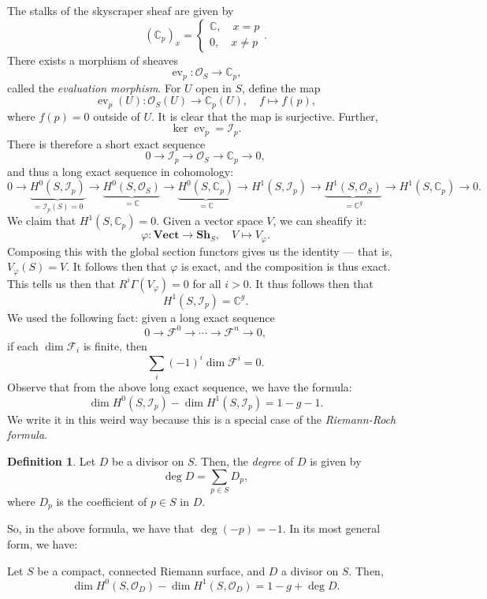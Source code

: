 \documentclass[a4paper]{report}
\theoremstyle{definition}
\newtheorem{definition}{Definition}
\theoremstyle{remark}
\theoremstyle{proposition}
\theoremstyle{conjecture}
\theoremstyle{lemma}
\theoremstyle{corollary}
\theoremstyle{exercise}
\theoremstyle{example}
\newcommand{\C}{\mathbb{C}}
\newcommand{\mcal}{\mathcal}
\newcommand{\on}{\operatorname}
\begin{document}
The stalks of the skyscraper sheaf are given by 
$$(\C_p)_x = \begin{cases}
    \C, \quad x =p\\
    0,\quad x \neq p
\end{cases}.$$
There exists a morphism of sheaves
$$\on{ev}_p : \mcal{O}_S \longrightarrow \C_p,$$ called the 
\emph{evaluation morphism}. For $U$ open in $S$, define the map
$$\on{ev}_p(U) : \mcal{O}_S(U) \longrightarrow \C_p(U),\quad f\longmapsto f(p),$$
where $f(p) = 0$ outside of $U$. It is clear that the map is surjective.
Further, $$\ker \on{ev}_p = \mcal{I}_p.$$
There is therefore a short exact sequence
$$0\longrightarrow\mcal{I}_p \longrightarrow \mcal{O}_S\longrightarrow\C_p\longrightarrow0,$$
and thus a long exact sequence in cohomology:
$$0\longrightarrow \underbrace{H^0(S,\mcal{I}_p)}_{=\mcal{I}_p(S)=0} \longrightarrow \underbrace{H^0(S,\mcal{O}_S)}_{=\C} \longrightarrow \underbrace{H^0(S,\C_p)}_{=\C} \longrightarrow H^1(S,\mcal{I}_p) \longrightarrow \underbrace{H^1(S,\mcal{O}_S)}_{=\C^g} \longrightarrow H^1(S,\C_p)\longrightarrow 0.$$
We claim that $H^1(S,\C_p) = 0$.
Given a vector space $V$, we can sheafify it:
$$\varphi: \mathbf{Vect}\longrightarrow \mathbf{Sh}_S,\quad V\longmapsto V_\varphi.$$
Composing this with the global section functors gives us the identity ---
that is, $V_\varphi(S) = V$.
It follows then that $\varphi$ is exact, and the composition is thus 
exact. This tells us then that $R^i\Gamma(V_\varphi) = 0$ for all $i>0$.
It thus follows then that 
$$H^1(S,\mcal{I}_p) = \C^g.$$
We used the following fact:
given a long exact sequence
$$0\longrightarrow \mcal{F}^0 \longrightarrow \cdots \longrightarrow\mcal{F}^n\longrightarrow 0,$$
if each $\dim \mcal{F}_i$ is finite, then
$$\sum_i(-1)^i \dim \mcal{F}^i = 0.$$
Observe that from the above long exact sequence, we have the formula:
$$\dim H^0(S,\mcal{I}_p) - \dim H^1(S,\mcal{I}_p) = 1-g - 1.$$
We write it in this weird way because this is a special case of the 
\emph{Riemann-Roch formula}.

\begin{definition}
    Let $D$ be a divisor on $S$. Then, the \emph{degree} of $D$ is given by 
    $$\deg D = \sum_{p\in S}D_p,$$
    where $D_p$ is the coefficient of $p\in S$ in $D$.
\end{definition}

So, in the above formula, we have that $\deg (-p) = -1$. In its most 
general form, we have:

\begin{theorem}
    Let $S$ be a compact, connected Riemann surface, and $D$ a divisor on
    $S$.
    Then,
    $$\dim H^0(S,\mcal{O}_D) - \dim H^1(S,\mcal{O}_D) = 1-g + \deg D.$$
\end{theorem}
\end{document}
